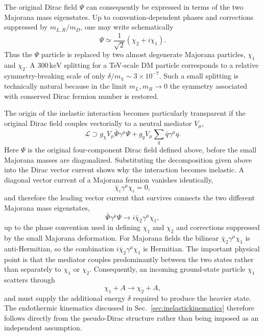 \documentclass[aps,prd,reprint,superscriptaddress,nofootinbib,longbibliography,floatfix]{revtex4-2}
\newcommand{\keV}{\mathrm{keV}}
\begin{document}
The original Dirac field $\Psi$ can consequently be expressed in terms of the two Majorana mass eigenstates. Up to convention-dependent phases and corrections suppressed by $m_{L,R}/m_D$, one may write schematically
\begin{equation}
\Psi\simeq\frac{1}{\sqrt{2}}\left(\chi_2+i\chi_1\right).
\end{equation}
Thus the $\Psi$ particle is replaced by two almost degenerate Majorana particles, $\chi_1$ and $\chi_2$. A $300\,\keV$ splitting for a TeV-scale DM particle corresponds to a relative symmetry-breaking scale of only $\delta/m_\chi\sim3\times10^{-7}$. Such a small splitting is technically natural because in the limit $m_L,m_R\rightarrow0$ the symmetry associated with conserved Dirac fermion number is restored.

The origin of the inelastic interaction becomes particularly transparent if the original Dirac field couples vectorially to a neutral mediator $V_\mu$,
\begin{equation}
\mathcal{L}\supset g_\chi V_\mu\bar\Psi\gamma^\mu\Psi
+g_qV_\mu\sum_q\bar q\gamma^\mu q.
\label{eq:diracvector}
\end{equation}
Here $\Psi$ is the original four-component Dirac field defined above, before the small Majorana masses are diagonalized. Substituting the decomposition given above into the Dirac vector current shows why the interaction becomes inelastic. A diagonal vector current of a Majorana fermion vanishes identically,
\begin{equation}
\bar\chi_i\gamma^\mu\chi_i=0,
\end{equation}
and therefore the leading vector current that survives connects the two different Majorana mass eigenstates,
\begin{equation}
\bar\Psi\gamma^\mu\Psi
\longrightarrow
i\bar\chi_2\gamma^\mu\chi_1,
\label{eq:offdiagonalcurrent}
\end{equation}
up to the phase convention used in defining $\chi_1$ and $\chi_2$ and corrections suppressed by the small Majorana deformation. For Majorana fields the bilinear $\bar\chi_2\gamma^\mu\chi_1$ is anti-Hermitian, so the combination $i\bar\chi_2\gamma^\mu\chi_1$ is Hermitian. The important physical point is that the mediator couples predominantly between the two states rather than separately to $\chi_1$ or $\chi_2$. Consequently, an incoming ground-state particle $\chi_1$ scatters through
\begin{equation}
\chi_1+A\rightarrow\chi_2+A,
\end{equation}
and must supply the additional energy $\delta$ required to produce the heavier state. The endothermic kinematics discussed in Sec.~\ref{sec:inelastickinematics} therefore follows directly from the pseudo-Dirac structure rather than being imposed as an independent assumption.
\end{document}
